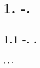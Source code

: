 \documentclass[a4paper]{article}
\begin{document}
\bigskip


\bigskip

\clearpage\section{{\CYRG}{\cyrl}{\cyra}{\cyrv}{\cyra} 1. {\CYRP}{\cyrr}{\cyrya}{\cyrm}{\cyro}{\cyre}
{\cyrp}{\cyrr}{\cyri}{\cyrb}{\cyrl}{\cyri}{\cyrzh}{\cyre}{\cyrn}{\cyri}{\cyre}
{\CYRB}{\cyro}{\cyrr}{\cyrn}{\cyra}-{\CYRO}{\cyrp}{\cyrp}{\cyre}{\cyrn}{\cyrg}{\cyre}{\cyrishrt}{\cyrm}{\cyre}{\cyrr}{\cyra}.}
\hypertarget{RefHeading4669463868395}{}\subsection{1.1
{\CYRP}{\cyrr}{\cyri}{\cyrb}{\cyrl}{\cyri}{\cyrzh}{\cyre}{\cyrn}{\cyri}{\cyre}
{\CYRB}{\cyro}{\cyrr}{\cyrn}{\cyra}-{\CYRO}{\cyrp}{\cyrp}{\cyre}{\cyrn}{\cyrg}{\cyre}{\cyrishrt}{\cyrm}{\cyre}{\cyrr}{\cyra}.
{\CYRG}{\cyrr}{\cyra}{\cyrn}{\cyri}{\cyrc}{\cyrery}
{\cyrp}{\cyrr}{\cyri}{\cyrm}{\cyre}{\cyrn}{\cyri}{\cyrm}{\cyro}{\cyrs}{\cyrt}{\cyri}.}
\hypertarget{RefHeading4671463868395}{}{\CYRD}{\cyrv}{\cyri}{\cyrzh}{\cyre}{\cyrn}{\cyri}{\cyre}
{\cyrerev}{\cyrl}{\cyre}{\cyrk}{\cyrt}{\cyrr}{\cyro}{\cyrn}{\cyra} {\cyrv}
{\cyrn}{\cyre}{\cyrp}{\cyrr}{\cyro}{\cyrn}{\cyri}{\cyrk}{\cyra}{\cyryu}{\cyrshch}{\cyre}{\cyrm}
{\cyrr}{\cyri}{\cyrd}{\cyrb}{\cyre}{\cyrr}{\cyrg}{\cyro}{\cyrv}{\cyrs}{\cyrk}{\cyro}{\cyrm}
{\cyrs}{\cyro}{\cyrs}{\cyrt}{\cyro}{\cyrya}{\cyrn}{\cyri}{\cyri}
{\cyro}{\cyrp}{\cyri}{\cyrs}{\cyrery}{\cyrv}{\cyra}{\cyre}{\cyrt}{\cyrs}{\cyrya} {\cyre}{\cyrg}{\cyro}
{\cyrd}{\cyra}{\cyrl}{\cyrsftsn}{\cyrn}{\cyro}{\cyrd}{\cyre}{\cyrishrt}{\cyrs}{\cyrt}{\cyrv}{\cyru}{\cyryu}{\cyrshch}{\cyri}{\cyrm}
{\cyrv}{\cyrz}{\cyra}{\cyri}{\cyrm}{\cyro}{\cyrd}{\cyre}{\cyrishrt}{\cyrs}{\cyrt}{\cyrv}{\cyri}{\cyre}{\cyrm} {\cyrs}
{\cyro}{\cyrs}{\cyrt}{\cyro}{\cyrv}{\cyro}{\cyrm}, {\cyra} {\cyri}{\cyrm}{\cyre}{\cyrn}{\cyrn}{\cyro},
{\cyrv}{\cyrz}{\cyra}{\cyri}{\cyrm}{\cyro}{\cyrd}{\cyre}{\cyrishrt}{\cyrs}{\cyrt}{\cyrv}{\cyri}{\cyre}{\cyrm} {\cyrs}
{\cyrk}{\cyru}{\cyrl}{\cyro}{\cyrn}{\cyro}{\cyrv}{\cyrs}{\cyrk}{\cyri}{\cyrm}
{\cyrp}{\cyro}{\cyrt}{\cyre}{\cyrn}{\cyrc}{\cyri}{\cyra}{\cyrl}{\cyro}{\cyrm},
{\cyrk}{\cyro}{\cyrm}{\cyrb}{\cyri}{\cyrn}{\cyri}{\cyrr}{\cyro}{\cyrv}{\cyra}{\cyrn}{\cyrn}{\cyrery}{\cyrm} {\cyrs}
{\cyrp}{\cyro}{\cyrt}{\cyre}{\cyrn}{\cyrc}{\cyri}{\cyra}{\cyrl}{\cyro}{\cyrm}
{\cyrs}{\cyrv}{\cyro}{\cyrb}{\cyro}{\cyrd}{\cyrn}{\cyro}
{\cyrv}{\cyrr}{\cyra}{\cyrshch}{\cyra}{\cyryu}{\cyrshch}{\cyre}{\cyrg}{\cyro}{\cyrs}{\cyrya}
\end{document}
